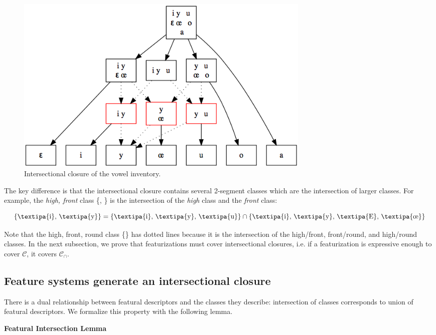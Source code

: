 \documentclass[11pt, oneside]{article}   	%
\begin{document}
\begin{figure}[h]
  \centering
  \includegraphics[width=0.7\textwidth]{vowel_inventory_closure.png}
  \caption{Intersectional closure of the vowel inventory.}
  \label{fig:vowel_inventory_closure}
\end{figure}

The key difference is that the intersectional closure contains several 2-segment classes which are the intersection of larger classes. For example, the \textit{high, front} class \{, \} is the intersection of the \textit{high} class and the \textit{front} class:

$$ \text{\{\textipa{i}, \textipa{y}\}} = \text{\{\textipa{i}, \textipa{y}, \textipa{u}\}} \cap \text{\{\textipa{i}, \textipa{y}, \textipa{E}, \textipa{\oe}\}} $$

\vspace{\baselineskip} \noindent Note that the high, front, round class \{\} has dotted lines because it is the intersection of the high/front, front/round, and high/round classes. In the next subsection, we prove that featurizations must cover intersectional closures, i.e. if a featurization is expressive enough to cover $\mathcal C$, it covers $\mathcal C_\cap$.

\subsection{Feature systems generate an intersectional closure}

There is a dual relationship between featural descriptors and the classes they describe: intersection of classes corresponds to union of featural descriptors. We formalize this property with the following lemma.

\vspace{\baselineskip} \noindent \textbf{Featural Intersection Lemma}
\end{document}
